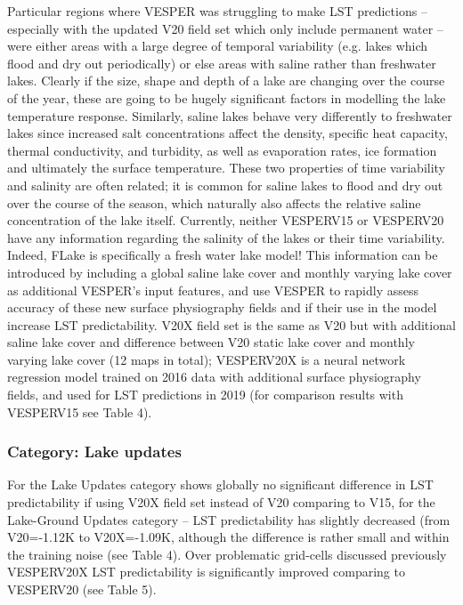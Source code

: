 \documentclass[hess, manuscript]{copernicus}
\begin{document}
Particular regions where VESPER was struggling to make LST predictions – especially with the updated V20 field set which only include permanent water – were either areas with a large degree of temporal variability (e.g. lakes which flood and dry out periodically) or else areas with saline rather than freshwater lakes. Clearly if the size, shape and depth of a lake are changing over the course of the year, these are going to be hugely significant factors in modelling the lake temperature response. Similarly, saline lakes behave very differently to freshwater lakes since increased salt concentrations affect the density, specific heat capacity, thermal conductivity, and turbidity, as well as evaporation rates, ice formation and ultimately the surface temperature. These two properties of time variability and salinity are often related; it is common for saline lakes to flood and dry out over the course of the season, which naturally also affects the relative saline concentration of the lake itself.
Currently, neither VESPERV15 or VESPERV20 have any information regarding the salinity of the lakes or their time variability. Indeed, FLake is specifically a fresh water lake model! This information can be introduced by including a global saline lake cover and monthly varying lake cover as additional VESPER’s input features, and use VESPER to rapidly assess accuracy of these new surface physiography fields and if their use in the model increase LST predictability. V20X field set is the same as V20 but with additional saline lake cover and difference between V20 static lake cover and monthly varying lake cover (12 maps in total); VESPERV20X is a neural network regression model trained on 2016 data with additional surface physiography fields, and used for LST predictions in 2019 (for comparison results with VESPERV15 see Table 4).

\subsubsection{Category: Lake updates}

For the Lake Updates category shows globally no significant difference in LST predictability if using V20X field set instead of V20 comparing to V15, for the Lake-Ground Updates category – LST predictability has slightly decreased (from V20=-1.12K to V20X=-1.09K, although the difference is rather small and within the training noise (see Table 4). Over problematic grid-cells discussed previously VESPERV20X LST predictability is significantly improved comparing to VESPERV20 (see Table 5). 
\end{document}
